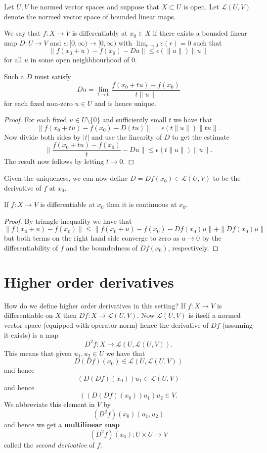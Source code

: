 \documentclass[twoside, a4paper, 10pt]{amsart}
\begin{document}
Let $U,V$ be normed vector spaces and suppose that $X \subset U$ is open. Let $\mathcal{L}(U,V)$ denote the normed vector space of bounded linear maps.

\begin{mydef} 

We say that $f: X \to V$ is differentiably at $x_0 \in X$ if there exists a bounded linear map $D: U \to V$ and $\epsilon: [0,\infty) \to [0, \infty)$ with $\lim_{r \to 0} \epsilon(r) = 0$ such that $$\| f (x_0+u) - f(x_0) - Du \| \leq  \epsilon( \|u \|) \|u \|$$ for all $u$ in some open neighbhourhood of $0$.

\end{mydef}

\begin{lemma} \label{lemma: Derivative unique} Such a $D$ must satisfy $$ Du = \lim_{t \to 0} \frac{f(x_0+tu) - f(x_0)}{t \|u \|} $$ for each fixed non-zero $u \in U$ and is hence unique. \end{lemma}

\begin{proof} For each fixed $u \in U \setminus \{0 \} $ and sufficiently small $t$ we have that $$\| f(x_0+tu) - f(x_0) - D(tu) \| = \epsilon(t \| u \|) \|t u \|. $$ Now divide both sides by $|t|$ and use the linearity of $D$ to get the estimate $$ \| \frac{f(x_0+tu) - f(x_0)}{t } - Du \| \leq \epsilon(t \|u \|) \| u \|.$$  The result now follows by letting $t \to 0$. \end{proof}

Given the uniqueness, we can now define $D = Df(x_0) \in \mathcal{L}(U,V)$ to be the derivative of $f$ at $x_0$. 

\begin{lemma} If $f:X \to V$ is differentiable at $x_0$ then it is continuous at $x_0$. \end{lemma}

\begin{proof} By triangle inequality we have that $$\| f(x_0 + u) - f(x_0) \| \leq  \| f(x_0 + u ) - f(x_0) - Df(x_0) u \| + \|Df(x_0)u \|$$ but both terms on the right hand side converge to zero as $u \to 0$ by the differentiability of $f$ and the boundedness of $Df(x_0)$, respectively. \end{proof}

\section{Higher order derivatives}

How do we define higher order derivatives in this setting? If $f:X \to V$ is differentiable on $X$ then $Df: X \to \mathcal{L}(U,V)$. Now $\mathcal{L}(U,V)$ is itself a normed vector space (equipped with operator norm) hence the derivative of $Df$ (assuming it exists) is a map $$D^2 f: X \to \mathcal{L}(U, \mathcal{L}(U,V)).$$ This means that given $u_1, u_2 \in U$ we have that $$D(Df)(x_0) \in \mathcal{L}(U,\mathcal{L}(U,V))$$ and hence $$(D(Df)(x_0) )u_1 \in \mathcal{L}(U,V)$$ and hence $$((D(Df)(x_0))u_1)u_2 \in V.$$ We abbreviate this element in $V$ by $$(D^2f)  (x_0) (u_1, u_2)$$ and hence we get a \textbf{multilinear map} $$(D^2 f) (x_0):U \times U \to V$$ called the \textit{second derivative} of $f$.
\end{document}
